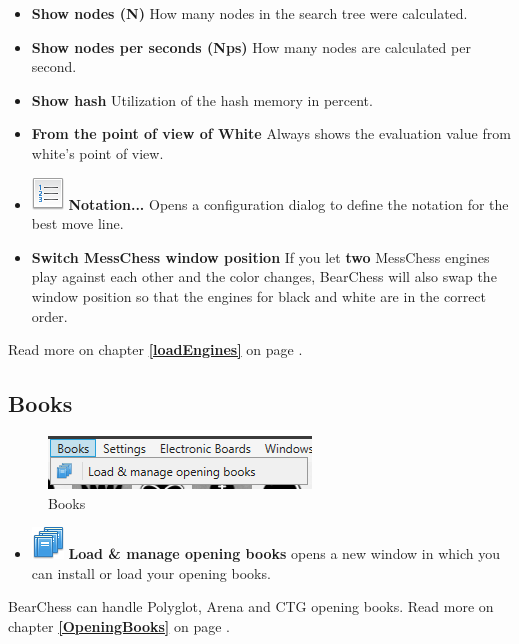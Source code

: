 \documentclass[11pt,a4paper]{article}
\begin{document}
	\begin{itemize}
		\item  \textbf{Show nodes (N)} How many nodes in the search tree were calculated.
		\item \textbf{Show nodes per seconds (Nps)} How many nodes are calculated per second.
		\item \textbf{Show hash} Utilization of the hash memory in percent.
		\item \textbf{From the point of view of White} Always shows the evaluation value from white's point of view.
		\item  \includegraphics[scale=0.5]{text_list_numbers.png} \textbf{Notation...} Opens a configuration dialog to define the notation for the best move line.
		\item \textbf{Switch MessChess window position} If you let \textbf{two} MessChess engines play against each other and the color changes, BearChess will also swap the window position so that the engines for black and white are in the correct order.
	\end{itemize}
	
	Read more on chapter \textbf{\ref{loadEngines}  } on page \pageref{loadEngines}.
	
	\subsection{Books}
	\begin{figure}[H]
		\centering
		\includegraphics[scale=1.0]{Books.png}
		\caption{Books}
		\label{fig:Books}
	\end{figure}
	\begin{itemize}
		\item \includegraphics[scale=0.5]{books_stack.png} \textbf{Load \& manage opening books} opens a new window in which you can install or load  your opening books.
	\end{itemize}
	BearChess can handle Polyglot, Arena and CTG opening books. Read more on chapter \textbf{\ref{OpeningBooks}  } on page \pageref{OpeningBooks}.
	
\end{document}
